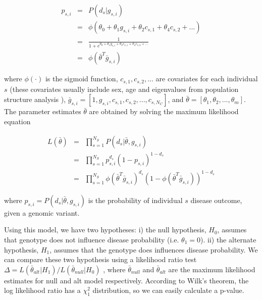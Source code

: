 \begin{eqnarray*}
    p_{s,i} & = & P( d_s | g_{s,i} ) \\
    & = & \phi( \theta_0 + \theta_1 g_{s,i} + \theta_2 c_{s,1} + \theta_4 c_{s,2} + ... ) \\
    & = & \frac{1}{1 + e^{\theta_0 + \theta_1 g_{s,i} + \theta_2 c_{s,1} + \theta_4 c_{s,2} + ...}} \\
    & = & \phi( \bar{\theta}^T \bar{g}_{s,i})
\end{eqnarray*}

where $\phi(\cdot)$ is the sigmoid function, $c_{s,1}, c_{s,2}, ... $ are covariates for each individual $s$ (these covariates usually include sex, age and eigenvalues from population structure analysis \cite{price2006principal}), $\bar{g}_{s,i} = [ 1, g_{s,i} , c_{s,1}, c_{s,2}, ... , c_{s,N_C} ]$, and $\bar{\theta} = [\theta_1, \theta_2, ..., \theta_m] $. The parameter estimates $\bar{\theta}$ are obtained by solving the maximum likelihood equation

\begin{eqnarray*}
    L( \bar{\theta} ) & = & \prod_{s=1}^{N_S}{ P( d_s | \bar{\theta}, g_{s,i} ) } \\
    & = & \prod_{s=1}^{N_S}{ p_{s,i}^{d_s} (1-p_{s,i})^{1-d_s} } \\
    & = & \prod_{s=1}^{N_S}{ \phi( \bar{\theta}^T \bar{g}_{s,i})^{d_s} (1-\phi( \bar{\theta}^T \bar{g}_{s,i}))^{1-d_s} }
\end{eqnarray*}

where $p_{s,i} = P( d_s | \bar{\theta}, g_{s,i} )$ is the probability of individual $s$ disease outcome, given a genomic variant.

Using this model, we have two hypotheses: i) the null hypothesis, $H_0$, assumes that genotype does not influence disease probability (i.e. $\theta_1 = 0$). ii) the alternate hypothesis, $H_1$, assumes that the genotype does influences disease probability. We can compare these two hypothesis using a likelihood ratio test $\Delta = L( \bar{\theta}_{alt} | H_1 ) / L( \bar{\theta}_{null} | H_0 ) $ , where $\bar{\theta}_{null}$ and $\bar{\theta}_{alt}$ are the maximum likelihood estimates for null and alt model respectively. According to Wilk's theorem, the log likelihood ratio has a $\chi^2_1$ distribution, so we can easily calculate a p-value.

